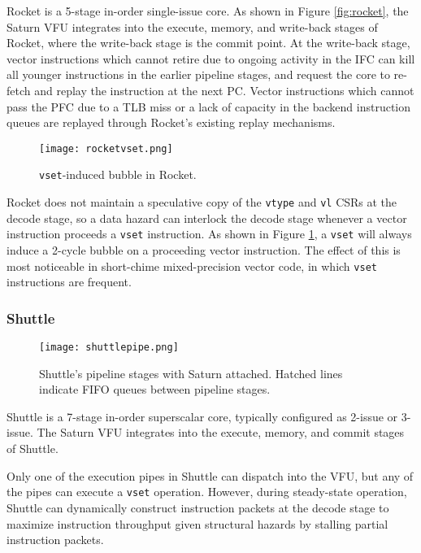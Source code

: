 Rocket is a 5-stage in-order single-issue core.
As shown in Figure \ref{fig:rocket}, the Saturn VFU integrates into the execute, memory, and write-back stages of Rocket, where the write-back stage is the commit point.
At the write-back stage, vector instructions which cannot retire due to ongoing activity in the IFC can kill all younger instructions in the earlier pipeline stages, and request the core to re-fetch and replay the instruction at the next PC.
Vector instructions which cannot pass the PFC due to a TLB miss or a lack of capacity in the backend instruction queues are replayed through Rocket's existing replay mechanisms.

\begin{figure}[h]
  \centering
  \texttt{[image: rocketvset.png]}
  \caption{\texttt{vset}-induced bubble in Rocket.}
  \label{fig:rocket-vset}
\end{figure}

Rocket does not maintain a speculative copy of the \texttt{vtype} and \texttt{vl} CSRs at the decode stage, so a data hazard can interlock the decode stage whenever a vector instruction proceeds a \texttt{vset} instruction.
As shown in Figure \ref{fig:rocket-vset}, a \texttt{vset} will always induce a 2-cycle bubble on a proceeding vector instruction.
The effect of this is most noticeable in short-chime mixed-precision vector code, in which \texttt{vset} instructions are frequent.


\subsubsection{Shuttle}


\begin{figure}[h]
  \centering
  \texttt{[image: shuttlepipe.png]}
  \caption{Shuttle's pipeline stages with Saturn attached. Hatched lines indicate FIFO queues between pipeline stages.}
  \label{fig:shuttle}
\end{figure}


Shuttle is a 7-stage in-order superscalar core, typically configured as 2-issue or 3-issue.
The Saturn VFU integrates into the execute, memory, and commit stages of Shuttle.

Only one of the execution pipes in Shuttle can dispatch into the VFU, but any of the pipes can execute a \texttt{vset} operation.
However, during steady-state operation, Shuttle can dynamically construct instruction packets at the decode stage to maximize instruction throughput given structural hazards by stalling partial instruction packets.

